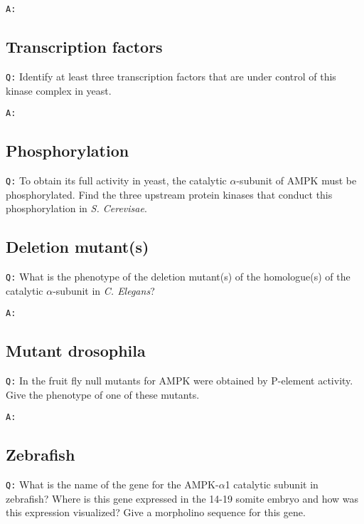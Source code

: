 \documentclass[11pt, a4paper,titlepage]{article}
\begin{document}
\noindent\texttt{A:} 

\subsection*{Transcription factors}

\texttt{Q:} Identify at least three transcription factors that are
under control of this kinase complex in yeast.
\smallskip

\noindent\texttt{A:} 

\subsection*{Phosphorylation}

\texttt{Q:} To obtain its full activity in yeast, the catalytic
$\alpha$-subunit of AMPK must be phosphorylated. Find the three upstream
protein kinases that conduct this phosphorylation in \emph{S. Cerevisae}.

\subsection*{Deletion mutant(s)}

\texttt{Q:} What is the phenotype of the deletion mutant(s) of the
homologue(s) of the catalytic $\alpha$-subunit in \emph{C. Elegans}?
\smallskip

\noindent\texttt{A:} 

\subsection*{Mutant drosophila}

\texttt{Q:} In the fruit fly null mutants for AMPK were obtained by
P-element activity. Give the phenotype of one of these mutants.
\smallskip

\noindent\texttt{A:} 

\subsection*{Zebrafish}

\texttt{Q:} What is the name of the gene for the AMPK-$\alpha$1
catalytic subunit in zebrafish? Where is this gene expressed in the
14-19 somite embryo and how was this expression visualized? Give a
morpholino sequence for this gene.
\smallskip
\end{document}
